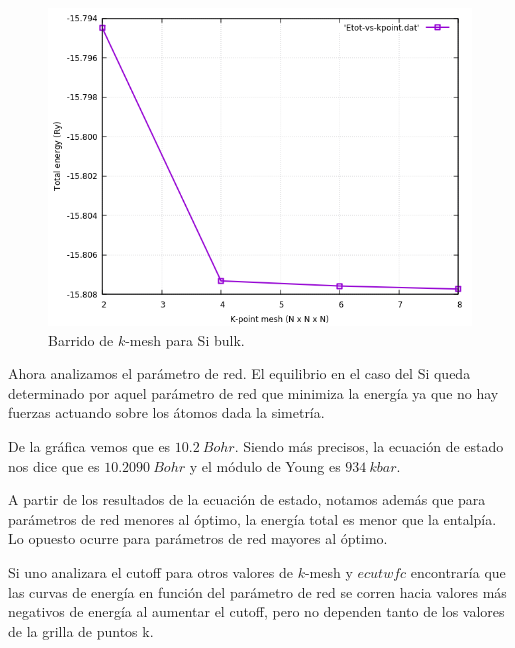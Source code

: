       \begin{figure}[H]
          \centering
          \includegraphics[scale = 0.6]{figs/D2/Si_k.png}
          \caption{Barrido de $k$-mesh para Si bulk.}
      \end{figure}


    Ahora analizamos el parámetro de red. El equilibrio en el caso del Si queda determinado por aquel parámetro de red que minimiza la energía ya que no hay fuerzas actuando sobre los átomos dada la simetría.


    De la gráfica vemos que es $10.2\ Bohr$. Siendo más precisos, la ecuación de estado nos dice que es $10.2090\ Bohr$ y el módulo de Young es $934\ kbar$.

    A partir de los resultados de la ecuación de estado, notamos además que para parámetros de red menores al óptimo, la energía total es menor que la entalpía. Lo opuesto ocurre para parámetros de red mayores al óptimo.

    Si uno analizara el cutoff para otros valores de $k$-mesh y $ecutwfc$ encontraría que las curvas de energía en función del parámetro de red se corren hacia valores más negativos de energía al aumentar el cutoff, pero no dependen tanto de los valores de la grilla de puntos k.

